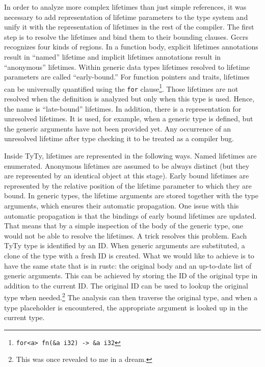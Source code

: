 \documentclass[
  11pt,
]{report}
\begin{document}
In order to analyze more complex lifetimes than just simple references,
it was necessary to add representation of lifetime parameters to the
type system and unify it with the representation of lifetimes in the
rest of the compiler. The first step is to resolve the lifetimes and
bind them to their bounding clauses. Gccrs recognizes four kinds of
regions. In a function body, explicit lifetimes annotations result in
``named'' lifetime and implicit lifetimes annotations result in
``anonymous'' lifetimes. Within generic data types lifetimes resolved to
lifetime parameters are called ``early-bound.'' For function pointers
and traits, lifetimes can be universally quantified using the
\texttt{for} clause\footnote{\texttt{for\textless{}\textquotesingle{}a\textgreater{}\ fn(\&\textquotesingle{}a\ i32)\ -\textgreater{}\ \&\textquotesingle{}a\ i32}}.
Those lifetimes are not resolved when the definition is analyzed but
only when this type is used. Hence, the name is ``late-bound''
lifetimes. In addition, there is a representation for unresolved
lifetimes. It is used, for example, when a generic type is defined, but
the generic arguments have not been provided yet. Any occurrence of an
unresolved lifetime after type checking it to be treated as a compiler
bug.

Inside TyTy, lifetimes are represented in the following ways. Named
lifetimes are enumerated. Anonymous lifetimes are assumed to be always
distinct (but they are represented by an identical object at this
stage). Early bound lifetimes are represented by the relative position
of the lifetime parameter to which they are bound. In generic types, the
lifetime arguments are stored together with the type arguments, which
ensures their automatic propagation. One issue with this automatic
propagation is that the bindings of early bound lifetimes are updated.
That means that by a simple inspection of the body of the generic type,
one would not be able to resolve the lifetimes. A trick resolves this
problem. Each TyTy type is identified by an ID. When generic arguments
are substituted, a clone of the type with a fresh ID is created. What we
would like to achieve is to have the same state that is in rustc: the
original body and an up-to-date list of generic arguments. This can be
achieved by storing the ID of the original type in addition to the
current ID. The original ID can be used to lookup the original type when
needed.\footnote{This was once revealed to me in a dream.} The analysis
can then traverse the original type, and when a type placeholder is
encountered, the appropriate argument is looked up in the current type.
\end{document}
